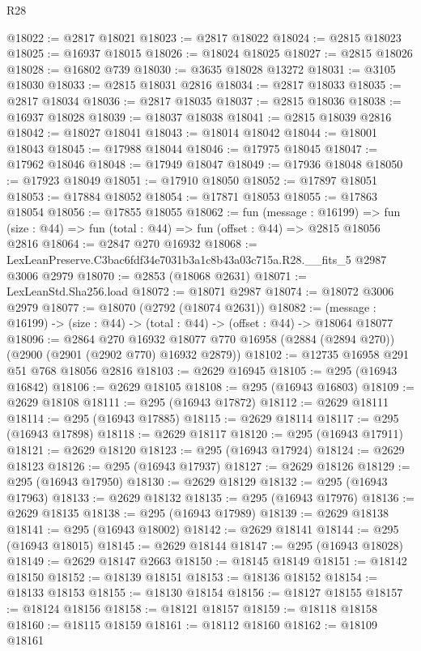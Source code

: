 \begin{lexlean}{R28}
\begin{coremodule}
@18022 := @2817 @18021
@18023 := @2817 @18022
@18024 := @2815 @18023
@18025 := @16937 @18015
@18026 := @18024 @18025
@18027 := @2815 @18026
@18028 := @16802 @739
@18030 := @3635 @18028 @13272
@18031 := @3105 @18030
@18033 := @2815 @18031 @2816
@18034 := @2817 @18033
@18035 := @2817 @18034
@18036 := @2817 @18035
@18037 := @2815 @18036
@18038 := @16937 @18028
@18039 := @18037 @18038
@18041 := @2815 @18039 @2816
@18042 := @18027 @18041
@18043 := @18014 @18042
@18044 := @18001 @18043
@18045 := @17988 @18044
@18046 := @17975 @18045
@18047 := @17962 @18046
@18048 := @17949 @18047
@18049 := @17936 @18048
@18050 := @17923 @18049
@18051 := @17910 @18050
@18052 := @17897 @18051
@18053 := @17884 @18052
@18054 := @17871 @18053
@18055 := @17863 @18054
@18056 := @17855 @18055
@18062 := fun (message : @16199) =>
  fun (size : @44) => fun (total : @44) => fun (offset : @44) => @2815 @18056 @2816
@18064 := @2847 @270 @16932
@18068 := LexLeanPreserve.C3bac6fdf34e7031b3a1c8b43a03c715a.R28.__fits_5 @2987 @3006 @2979
@18070 := @2853 (@18068 @2631)
@18071 := LexLeanStd.Sha256.load
@18072 := @18071 @2987
@18074 := @18072 @3006 @2979
@18077 := @18070 (@2792 (@18074 @2631))
@18082 := (message : @16199) -> (size : @44) -> (total : @44) -> (offset : @44) -> @18064 @18077
@18096 := @2864
    @270
    @16932
    @18077
    @770
    @16958
    (@2884 (@2894 @270))
    (@2900 (@2901 (@2902 @770) @16932 @2879))
@18102 := @12735 @16958 @291 @51 @768 @18056 @2816
@18103 := @2629 @16945
@18105 := @295 (@16943 @16842)
@18106 := @2629 @18105
@18108 := @295 (@16943 @16803)
@18109 := @2629 @18108
@18111 := @295 (@16943 @17872)
@18112 := @2629 @18111
@18114 := @295 (@16943 @17885)
@18115 := @2629 @18114
@18117 := @295 (@16943 @17898)
@18118 := @2629 @18117
@18120 := @295 (@16943 @17911)
@18121 := @2629 @18120
@18123 := @295 (@16943 @17924)
@18124 := @2629 @18123
@18126 := @295 (@16943 @17937)
@18127 := @2629 @18126
@18129 := @295 (@16943 @17950)
@18130 := @2629 @18129
@18132 := @295 (@16943 @17963)
@18133 := @2629 @18132
@18135 := @295 (@16943 @17976)
@18136 := @2629 @18135
@18138 := @295 (@16943 @17989)
@18139 := @2629 @18138
@18141 := @295 (@16943 @18002)
@18142 := @2629 @18141
@18144 := @295 (@16943 @18015)
@18145 := @2629 @18144
@18147 := @295 (@16943 @18028)
@18149 := @2629 @18147 @2663
@18150 := @18145 @18149
@18151 := @18142 @18150
@18152 := @18139 @18151
@18153 := @18136 @18152
@18154 := @18133 @18153
@18155 := @18130 @18154
@18156 := @18127 @18155
@18157 := @18124 @18156
@18158 := @18121 @18157
@18159 := @18118 @18158
@18160 := @18115 @18159
@18161 := @18112 @18160
@18162 := @18109 @18161

\end{coremodule}
\end{lexlean}
